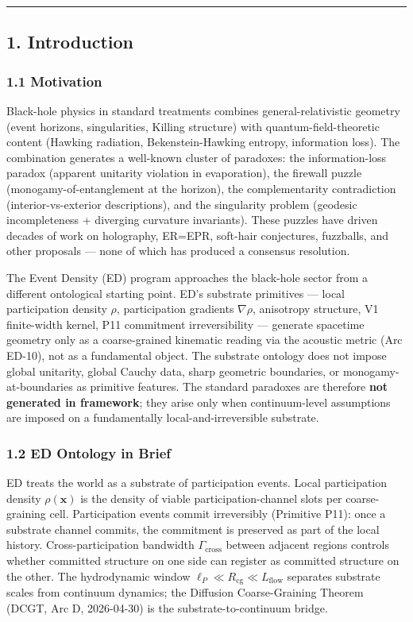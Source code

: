 \documentclass[
  11pt,
  a4paper,
]{article}
\newcounter{none} %
\begin{document}
\begin{center}\rule{0.5\linewidth}{0.5pt}\end{center}

\subsection{1. Introduction}\label{introduction}

\subsubsection{1.1 Motivation}\label{motivation}

Black-hole physics in standard treatments combines general-relativistic
geometry (event horizons, singularities, Killing structure) with
quantum-field-theoretic content (Hawking radiation, Bekenstein-Hawking
entropy, information loss). The combination generates a well-known
cluster of paradoxes: the information-loss paradox (apparent unitarity
violation in evaporation), the firewall puzzle (monogamy-of-entanglement
at the horizon), the complementarity contradiction (interior-vs-exterior
descriptions), and the singularity problem (geodesic incompleteness +
diverging curvature invariants). These puzzles have driven decades of
work on holography, ER=EPR, soft-hair conjectures, fuzzballs, and other
proposals --- none of which has produced a consensus resolution.

The Event Density (ED) program approaches the black-hole sector from a
different ontological starting point. ED's substrate primitives ---
local participation density \(\rho\), participation gradients
\(\nabla\rho\), anisotropy structure, V1 finite-width kernel, P11
commitment irreversibility --- generate spacetime geometry only as a
coarse-grained kinematic reading via the acoustic metric (Arc ED-10),
not as a fundamental object. The substrate ontology does not impose
global unitarity, global Cauchy data, sharp geometric boundaries, or
monogamy-at-boundaries as primitive features. The standard paradoxes are
therefore \textbf{not generated in framework}; they arise only when
continuum-level assumptions are imposed on a fundamentally
local-and-irreversible substrate.

\subsubsection{1.2 ED Ontology in Brief}\label{ed-ontology-in-brief}

ED treats the world as a substrate of participation events. Local
participation density \(\rho(\mathbf{x})\) is the density of viable
participation-channel slots per coarse-graining cell. Participation
events commit irreversibly (Primitive P11): once a substrate channel
commits, the commitment is preserved as part of the local history.
Cross-participation bandwidth \(\Gamma_\mathrm{cross}\) between adjacent
regions controls whether committed structure on one side can register as
committed structure on the other. The hydrodynamic window
\(\ell_P \ll R_\mathrm{cg} \ll L_\mathrm{flow}\) separates substrate
scales from continuum dynamics; the Diffusion Coarse-Graining Theorem
(DCGT, Arc D, 2026-04-30) is the substrate-to-continuum bridge.
\end{document}

